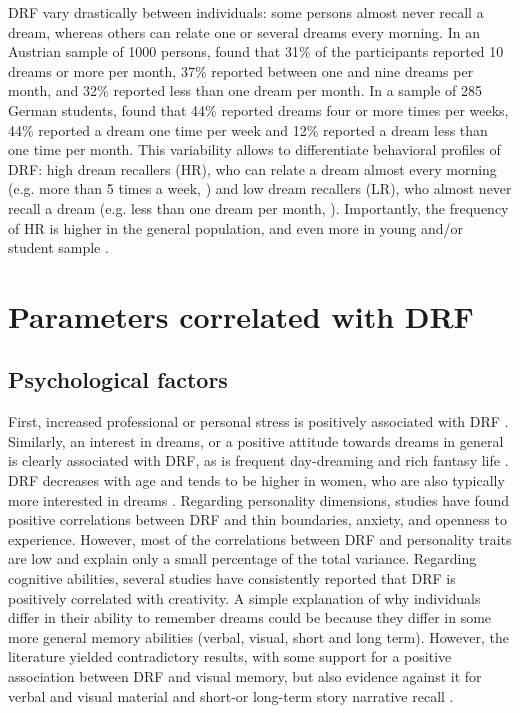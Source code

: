 DRF vary drastically between individuals: some persons almost never recall a dream, whereas others can relate one or several dreams every morning. In an Austrian sample of 1000 persons, \citet{stepansky_austrian_1998} found that 31\% of the participants reported 10 dreams or more per month, 37\% reported between one and nine dreams per month, and 32\% reported less than one dream per month. In a sample of 285 German students, \citet{schredl_questionnaires_2002} found that 44\% reported dreams four or more times per weeks, 44\% reported a dream one time per week and  12\% reported a dream less than one time per month. This variability allows to differentiate behavioral profiles of DRF: high dream recallers (HR), who can relate a dream almost every morning (e.g. more than 5 times a week, \citealp{schredl_reliability_2005}) and low dream recallers (LR), who almost never recall a dream (e.g. less than one dream per month, \citealp{goodenough_comparison_1959}). Importantly, the frequency of HR is higher in the general population, and even more in young and/or student sample \citep{schredl_reliability_2005}.

\section{Parameters correlated with DRF}
\label{sec:dream-recall:param}

\subsection{Psychological factors}
\label{sec:dream-recall:param:psych}

First, increased professional or personal stress is positively associated with DRF \citep{schredl_dream_1999}. Similarly, an interest in dreams, or a positive attitude towards dreams in general is clearly associated with DRF, as is frequent day-dreaming and rich fantasy life \citep{schredl_factors_2003}. DRF decreases with age and tends to be higher in women, who are also typically more interested in dreams \citep{schredl_dream_2008, schredl_gender_2008}. Regarding personality dimensions, studies have found positive correlations between DRF and thin boundaries, anxiety, and openness to experience. However, most of the correlations between DRF and personality traits are low and explain only a small percentage of the total variance. Regarding cognitive abilities, several studies have consistently reported that DRF is positively correlated with creativity. A simple explanation of why individuals differ in their ability to remember dreams could be because they differ in some more general memory abilities (verbal, visual, short and long term). However, the literature yielded contradictory results, with some support for a positive association between DRF and visual memory, but also evidence against it for verbal and visual material and short-or long-term story narrative recall \citep{ruby_experimental_2011, blagrove_trait_2010}.


